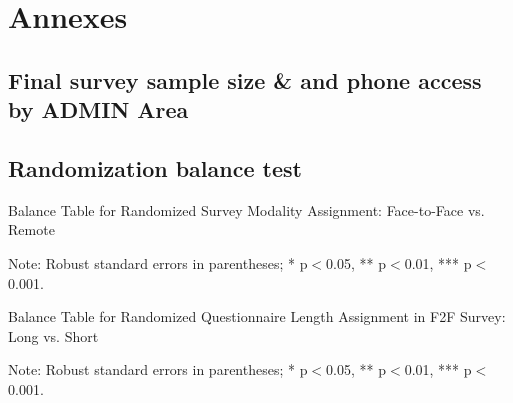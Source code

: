 \documentclass[11pt,harvard]{article}
\begin{document}
\pagebreak


\section{Annexes}

\subsection{Final survey sample size \& and phone access by ADMIN Area}

\label{tab:CAR_rCARI_ADMIN_Area}

\subsection{Randomization balance test}

\begin{table}[htbp]
	\centering
	\begin{adjustbox}{max width=\textwidth}
		\begin{threeparttable}
			\caption{Balance Table for Randomized Survey Modality Assignment: Face-to-Face vs. Remote}
			\scriptsize
			 
			\label{tab:CAR_Listing_Demo_Balance_Modality}
			\begin{tablenotes}
				\item Note: Robust standard errors in parentheses; * p$<$0.05, ** p$<$0.01, *** p$<$0.001. 
			\end{tablenotes}
		\end{threeparttable}
	\end{adjustbox}
\end{table}



\begin{table}[htbp]
	\centering
	\begin{adjustbox}{max width=\textwidth}
		\begin{threeparttable}
			\caption{Balance Table for Randomized Questionnaire Length Assignment in F2F Survey: Long vs. Short}
			\scriptsize
			 
			\label{tab:CAR_Listing_Demo_Balance_F2F_Length}
			\begin{tablenotes}
				\item Note: Robust standard errors in parentheses; * p$<$0.05, ** p$<$0.01, *** p$<$0.001.
			\end{tablenotes}
		\end{threeparttable}
	\end{adjustbox}
\end{table}
\end{document}
